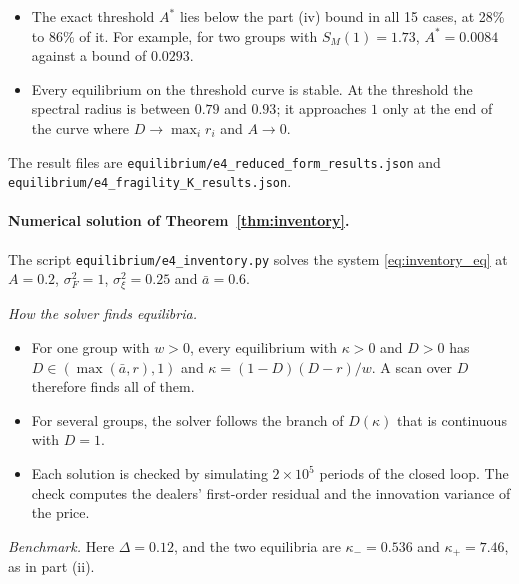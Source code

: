 \documentclass[12pt]{article}
\theoremstyle{definition}
\theoremstyle{remark}
\begin{document}
\begin{itemize}[itemsep=1pt,topsep=2pt]
\item The exact threshold $A^*$ lies below the part (iv) bound in all 15 cases, at 28\% to 86\% of it. For example, for two groups with $S_M(1)=1.73$, $A^*=0.0084$ against a bound of $0.0293$.
\item Every equilibrium on the threshold curve is stable. At the threshold the spectral radius is between $0.79$ and $0.93$; it approaches $1$ only at the end of the curve where $D\to\max_ir_i$ and $A\to0$.
\end{itemize}
The result files are \nolinkurl{equilibrium/e4_reduced_form_results.json} and \nolinkurl{equilibrium/e4_fragility_K_results.json}.

\paragraph{Numerical solution of Theorem~\ref{thm:inventory}.} The script \nolinkurl{equilibrium/e4_inventory.py} solves the system \eqref{eq:inventory_eq} at $A=0.2$, $\sigma_F^2=1$, $\sigma_\xi^2=0.25$ and $\bar a=0.6$.

\emph{How the solver finds equilibria.}
\begin{itemize}[itemsep=1pt,topsep=2pt]
\item For one group with $w>0$, every equilibrium with $\kappa>0$ and $D>0$ has $D\in(\max(\bar a,r),1)$ and $\kappa=(1-D)(D-r)/w$. A scan over $D$ therefore finds all of them.
\item For several groups, the solver follows the branch of $D(\kappa)$ that is continuous with $D=1$.
\item Each solution is checked by simulating $2\times10^5$ periods of the closed loop. The check computes the dealers' first-order residual and the innovation variance of the price.
\end{itemize}

\emph{Benchmark.} Here $\Delta=0.12$, and the two equilibria are $\kappa_-=0.536$ and $\kappa_+=7.46$, as in part (ii).
\end{document}
